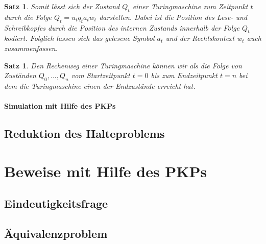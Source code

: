 \documentclass[]{scrartcl}
\newtheorem{satz}[definition]{Satz}
\begin{document}
			\begin{satz}
			Somit lässt sich der Zustand $Q_t$ einer Turingmaschine zum Zeitpunkt $t$ durch die Folge $Q_t = u_tq_ta_tw_t$ darstellen. Dabei ist die Position des Lese- und Schreibkopfes durch die Position des internen Zustands innerhalb der Folge $Q_t$ kodiert. Folglich lassen sich das gelesene Symbol $a_t$ und der Rechtskontext $w_t$ auch zusammenfassen.
			\end{satz}
			
			\begin{satz}
			Den Rechenweg einer Turingmaschine können wir als die Folge von Zuständen $Q_0, ..., Q_n$ vom Startzeitpunkt $t = 0$ bis zum Endzeitpunkt $t = n$ bei dem die Turingmaschine einen der Endzustände erreicht hat.
			\end{satz}
		
		\paragraph{Simulation mit Hilfe des PKPs}
			
			

	\subsection{Reduktion des Halteproblems}

\section{Beweise mit Hilfe des PKPs}

	\subsection{Eindeutigkeitsfrage}

	\subsection{Äquivalenzproblem}
\end{document}
